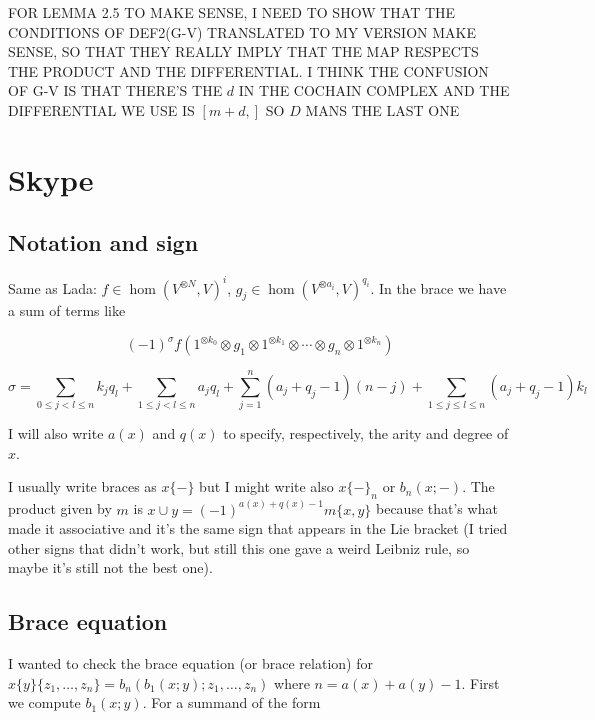 \documentclass[twoside]{article}
\begin{document}
FOR LEMMA 2.5 TO MAKE SENSE, I NEED TO SHOW THAT THE CONDITIONS OF DEF2(G-V) TRANSLATED TO MY VERSION MAKE SENSE, SO THAT THEY REALLY IMPLY THAT THE MAP RESPECTS THE PRODUCT AND THE DIFFERENTIAL. I THINK THE CONFUSION OF G-V IS THAT THERE'S THE $d$ IN THE COCHAIN COMPLEX AND THE DIFFERENTIAL WE USE IS $[m+d,]$ SO $D$ MANS THE LAST ONE




\newpage

\section{Skype}
 \subsection{Notation and sign}
 Same as Lada: $f\in\hom(V^{\otimes N},V)^i$, $g_j\in\hom(V^{\otimes a_i},V)^{q_i}$. In the brace we have a sum of terms like
 
 \[
 (-1)^{\sigma}f(1^{\otimes k_0}\otimes g_1\otimes 1^{\otimes k_1}\otimes\cdots\otimes g_n\otimes 1^{\otimes k_n})
 \]
 
 $$\sigma=\sum_{0\leq j<l\leq n}k_jq_l+\sum_{1\leq j<l\leq n}a_jq_l+\sum_{j=1}^n (a_j+q_j-1)(n-j)+\sum_{1\leq j\leq l\leq n} (a_j+q_j-1)k_l$$
 
 I will also write $a(x)$ and $q(x)$ to specify, respectively, the arity and degree of $x$.
 
 I usually write braces as $x\{-\}$ but I might write also $x\{-\}_n$ or $b_n(x;-)$. The product given by $m$ is $x\cup y=(-1)^{a(x)+q(x)-1}m\{x,y\}$ because that's what made it associative and it's the same sign that appears in the Lie bracket (I tried other signs that didn't work, but still this one gave a weird Leibniz rule, so maybe it's still not the best one).
 
 \subsection{Brace equation}
 
 I wanted to check the brace equation (or brace relation) for $x\{y\}\{z_1,\dots, z_n\}=b_n(b_1(x;y);z_1,\dots, z_n)$ where $n=a(x)+a(y)-1$. First we compute $b_1(x;y)$. For a summand of the form
 
\end{document}
